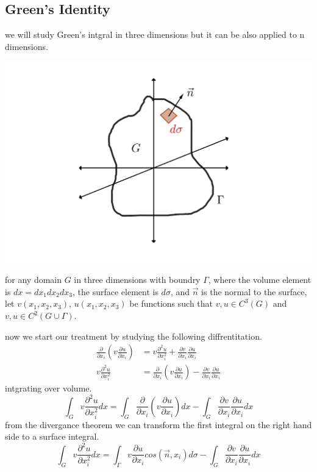 \documentclass[]{article}
\begin{document}
\subsection{Green's Identity}
we will study Green's intgral in three dimensions but it can be also applied to n dimensions.
\begin{center}
\includegraphics[scale=0.2]{green.png}
\end{center}
for any domain $G$ in three dimensions with boundry $\Gamma$, where the volume element is $dx = dx_1 dx_2 dx_3$, the surface element is $d\sigma$, and $\vec{n}$ is the normal to the surface, let $v(x_1,x_2,x_3)$, $u(x_1,x_2,x_3)$ be functions such that $v,u\in C^3(G)$ and $v,u\in C^2(G\cup \Gamma)$.
\par
now we start our treatment by studying the following diffrentitation. 
\begin{align*}
\frac{\partial }{\partial x_i}\left(v\frac{\partial u}{\partial x_i}\right) &= v\frac{\partial^2 u}{\partial x_{i}^{2}} + \frac{\partial v}{\partial x_i}\frac{\partial u}{\partial x_i}
\\
v\frac{\partial^2 u}{\partial x_{i}^{2}} &= \frac{\partial }{\partial x_i}\left(v\frac{\partial u}{\partial x_i}\right) - \frac{\partial v}{\partial x_i}\frac{\partial u}{\partial x_i}
\end{align*}
intgrating over volume.
\[
    \int_G v\frac{\partial^2 u}{\partial x_{i}^{2}} dx = \int_G \frac{\partial }{\partial x_i}\left(v\frac{\partial u}{\partial x_i}\right) dx - \int_G \frac{\partial v}{\partial x_i}\frac{\partial u}{\partial x_i} dx    
\]
from the divergance theorem we can transform the first integral on the right hand side to a surface integral.
\[
    \int_G v\frac{\partial^2 u}{\partial x_{i}^{2}} dx = \int_\Gamma v\frac{\partial u}{\partial x_i}cos(\vec{n},x_i) d\sigma - \int_G \frac{\partial v}{\partial x_i}\frac{\partial u}{\partial x_i} dx    
\]
\end{document}
